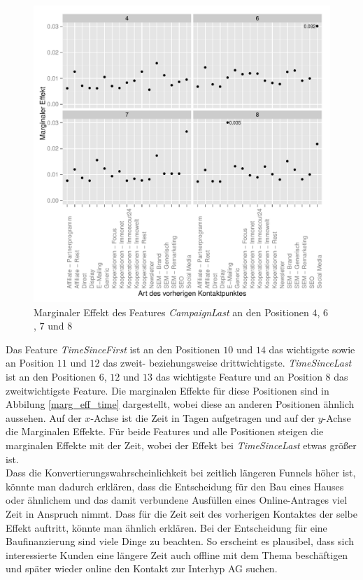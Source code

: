 \begin{figure}[H]
	\centering\includegraphics[scale=0.75]{marg_eff_campaignLast.pdf}\caption[Marginaler Effekt von \textit{CampaignLast}]{Marginaler Effekt des Features \textit{CampaignLast} an den Positionen $4$, $6$, $7$ und $8$}\label{marg_eff_campaignLast}
\end{figure}
Das Feature \textit{TimeSinceFirst} ist an den Positionen $10$ und $14$ das wichtigste sowie an Position $11$ und $12$ das zweit- beziehungsweise drittwichtigste. \textit{TimeSinceLast} ist an den Positionen $6$, $12$ und $13$ das wichtigste Feature und an Position $8$ das zweitwichtigste Feature. Die marginalen Effekte für diese Positionen sind in Abbilung \ref{marg_eff_time} dargestellt, wobei diese an anderen Positionen ähnlich aussehen. Auf der $x$-Achse ist die Zeit in Tagen aufgetragen und auf der $y$-Achse die Marginalen Effekte. Für beide Features und alle Positionen steigen die marginalen Effekte mit der Zeit, wobei der Effekt bei \textit{TimeSinceLast} etwas größer ist.\\
Dass die Konvertierungswahrscheinlichkeit bei zeitlich längeren Funnels höher ist, könnte man dadurch erklären, dass die Entscheidung für den Bau eines Hauses oder ähnlichem und das damit verbundene Ausfüllen eines Online-Antrages viel Zeit in Anspruch nimmt. Dass für die Zeit seit des vorherigen Kontaktes der selbe Effekt auftritt, könnte man ähnlich erklären. Bei der Entscheidung für eine Baufinanzierung sind viele Dinge zu beachten. So erscheint es plausibel, dass sich interessierte Kunden eine längere Zeit auch offline mit dem Thema beschäftigen und später wieder online den Kontakt zur Interhyp AG suchen.
